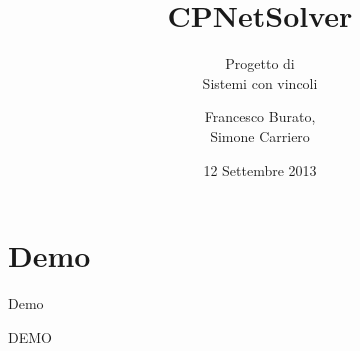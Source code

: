 \documentclass{beamer}
\title{CPNetSolver}
\subtitle{Progetto di\\
          Sistemi con vincoli}
\author{Francesco Burato,\\
        Simone Carriero}
\date{12 Settembre 2013}
\begin{document}
\maketitle




\section{Demo}
\begin{frame}{Demo}
\begin{center}
\Huge DEMO
\end{center}
\end{frame}
\end{document}
